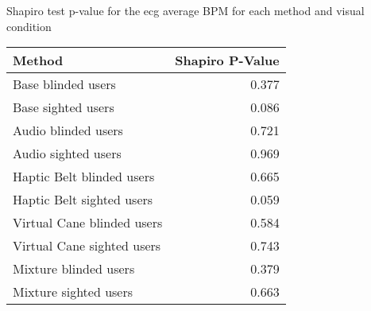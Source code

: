 
\centering
\caption{Shapiro test p-value for the ecg average BPM for each method and visual condition}
\label{tab:shapiro_ecg_bpm}
\begin{tabular}{lr}
\toprule
                    Method &  Shapiro P-Value \\
\midrule
        Base blinded users &            0.377 \\
        Base sighted users &            0.086 \\
       Audio blinded users &            0.721 \\
       Audio sighted users &            0.969 \\
 Haptic Belt blinded users &            0.665 \\
 Haptic Belt sighted users &            0.059 \\
Virtual Cane blinded users &            0.584 \\
Virtual Cane sighted users &            0.743 \\
     Mixture blinded users &            0.379 \\
     Mixture sighted users &            0.663 \\
\bottomrule
\end{tabular}
